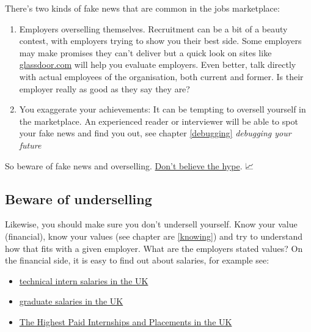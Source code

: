 \documentclass[
]{book}
\providecommand{\tightlist}{%
  \setlength{\itemsep}{0pt}\setlength{\parskip}{0pt}}
\begin{document}
There's two kinds of fake news that are common in the jobs marketplace:

\begin{enumerate}
\def\labelenumi{\arabic{enumi}.}
\tightlist
\item
  Employers overselling themselves. Recruitment can be a bit of a beauty contest, with employers trying to show you their best side. Some employers may make promises they can't deliver but a quick look on sites like \href{https://www.glassdoor.com}{glassdoor.com} will help you evaluate employers. Even better, talk directly with actual employees of the organisation, both current and former. Is their employer really as good as they say they are?
\item
  You exaggerate your achievements: It can be tempting to oversell yourself in the marketplace. An experienced reader or interviewer will be able to spot your fake news and find you out, see chapter \ref{debugging} \emph{debugging your future}
\end{enumerate}

So beware of fake news and overselling. \href{https://en.wikipedia.org/wiki/Don\%27t_Believe_the_Hype}{Don't believe the hype}. \citep{dontbelievethehype} 📈

\hypertarget{undersell}{%
\subsection{Beware of underselling}\label{undersell}}

Likewise, you should make sure you don't undersell yourself. Know your value (financial), know your values (see chapter are \ref{knowing}) and try to understand how that fits with a given employer. What are the employers stated values? On the financial side, it is easy to find out about salaries, for example see:

\begin{itemize}
\tightlist
\item
  \href{https://github.com/IgWod/interns-salaries-uk-2018}{technical intern salaries in the UK} \citep{igwod}
\item
  \href{https://luminate.prospects.ac.uk/graduate-salaries-in-the-uk}{graduate salaries in the UK} \citep{michaelgrove}
\item
  \href{https://www.ratemyplacement.co.uk/blog/highest-paid-internships-placements-uk/}{The Highest Paid Internships and Placements in the UK} \citep{louiseintern}
\end{itemize}
\end{document}

